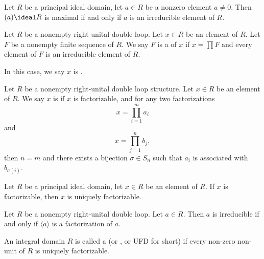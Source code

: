 \begin{theorem}
Let $R$ be a principal ideal domain, let $a\in R$ be a nonzero element $a\neq0$.
Then $(a)\ideal R$ is maximal if and only if $a$ is an irreducible
element of $R$.
\end{theorem}

\begin{definition}
Let $R$ be a nonempty right-unital double loop. Let $x\in R$ be an
element of $R$. Let $F$ be a nonempty finite sequence of $R$. We say
$F$ is a  of $x$ if $x=\prod F$ and every
element of $F$ is an irreducible element of $R$.

In this case, we say $x$ is .
\end{definition}

\begin{definition}
Let $R$ be a nonempty right-unital double loop structure. Let $x\in R$
be an element of $R$. We say $x$ is  if
$x$ is factorizable, and for any two factorizations
\begin{equation}
x=\prod^{m}_{i=1}a_{i}
\end{equation}
and
\begin{equation}
x=\prod^{n}_{j=1}b_{j},
\end{equation}
then $n=m$ and there exists a bijection $\sigma\in S_{n}$ such that
$a_{i}$ is associated with $b_{\sigma(i)}$. 
\end{definition}

\begin{proposition}
Let $R$ be a principal ideal domain, let $x\in R$ be an element of $R$.
If $x$ is factorizable, then $x$ is uniquely factorizable.
\end{proposition}

\begin{proposition}
Let $R$ be a nonempty right-unital double loop. Let $a\in R$.
Then $a$ is irreducible if and only if $\langle a\rangle$ is a
factorization of $a$.
\end{proposition}

\begin{definition}
An integral domain $R$ is called a 
(or , or UFD for short) if every non-zero non-unit
of $R$ is uniquely factorizable.
\end{definition}


